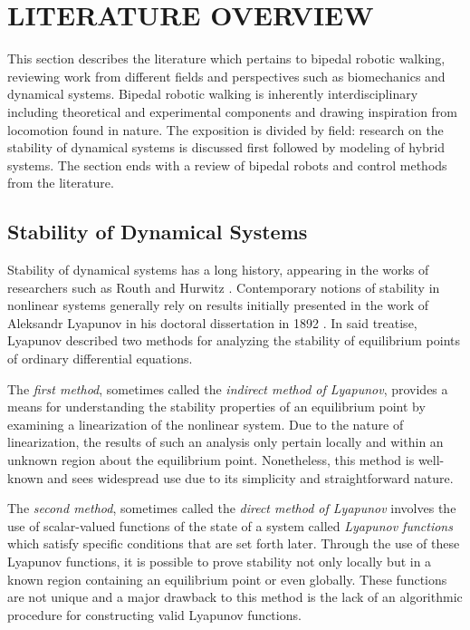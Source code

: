 \chapter{\uppercase{Literature Overview}}

This section describes the literature which pertains to bipedal robotic walking,
reviewing work from different fields and perspectives such as biomechanics and
dynamical systems.
%
Bipedal robotic walking is inherently interdisciplinary including theoretical
and experimental components and drawing inspiration from locomotion found in
nature.
%
The exposition is divided by field:
%
research on the stability of dynamical systems is discussed first followed by
modeling of hybrid systems.
%
The section ends with a review of bipedal robots and control methods from the
literature.

\section{Stability of Dynamical Systems} \label{sec:literature-stability}

Stability of dynamical systems has a long history, appearing in the works of
researchers such as Routh \cite{Routh1877} and Hurwitz \cite{Hurwitz1895}.
%
Contemporary notions of stability in nonlinear systems generally rely on results
initially presented in the work of Aleksandr Lyapunov in his doctoral
dissertation in 1892 \cite{Lyapunov1992}.
%
In said treatise, Lyapunov described two methods for analyzing the stability of
equilibrium points of ordinary differential equations.

The {\em first method}, sometimes called the {\em indirect method of Lyapunov},
provides a means for understanding the stability properties of an equilibrium
point by examining a linearization of the nonlinear system.
%
Due to the nature of linearization, the results of such an analysis only pertain
locally and within an unknown region about the equilibrium point.
%
Nonetheless, this method is well-known and sees widespread use due to its
simplicity and straightforward nature.
%

The {\em second method}, sometimes called the {\em direct method of Lyapunov}
involves the use of scalar-valued functions of the state of a system called {\em
  Lyapunov functions} which satisfy specific conditions that are set forth
later.
%
Through the use of these Lyapunov functions, it is possible to prove
stability not only locally but in a known region containing an equilibrium point
or even globally.
%
These functions are not unique and a major drawback to this method is the lack
of an algorithmic procedure for constructing valid Lyapunov functions.

